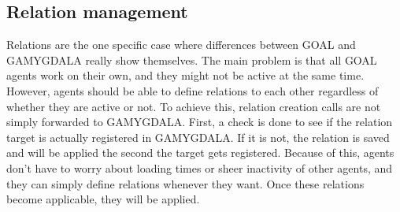 \subsection{Relation management}
Relations are the one specific case where differences between GOAL and GAMYGDALA really show themselves. The main problem is that all GOAL agents work on their own, and they might not be active at the same time. However, agents should be able to define relations to each other regardless of whether they are active or not.
To achieve this, relation creation calls are not simply forwarded to GAMYGDALA. First, a check is done to see if the relation target is actually registered in GAMYGDALA. If it is not, the relation is saved and will be applied the second the target gets registered.
Because of this, agents don't have to worry about loading times or sheer inactivity of other agents, and they can simply define relations whenever they want. Once these relations become applicable, they will be applied.